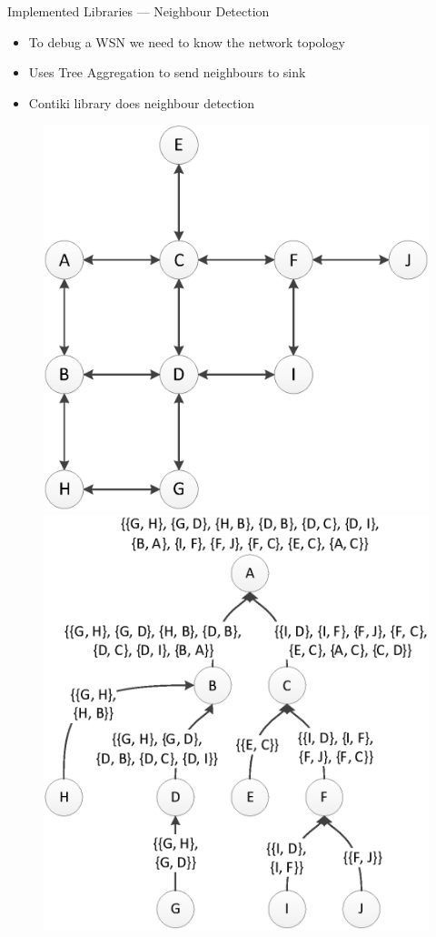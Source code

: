 \documentclass[usenames,dvipsnames]{beamer}
\begin{document}
\begin{frame}{Implemented Libraries --- Neighbour Detection}
	\begin{itemize}
		\item To debug a WSN we need to know the network topology
		\item Uses Tree Aggregation to send neighbours to sink
		\item Contiki library does neighbour detection
	\end{itemize}

\begin{figure}[H]
\includegraphics[scale=0.35]{../Report/Diagrams/neighbour-network.eps}\hspace{1em}
\includegraphics[scale=0.35]{../Report/Diagrams/neighbour-tree-structure.eps}

\end{figure}
\end{frame}
\end{document}
